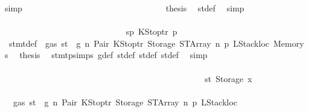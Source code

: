\begin{isabellebody}
\ simp\isanewline
\ \ \ \ \ \ \ \ \ \ \ \ \ \ \ \ \ \ \ \ \ \ \ \ \ \ \ \ \ \ \isamarkupfalse%
\ \isamarkupfalse%
\ {\isacharquery}{\kern0pt}thesis\ \isamarkupfalse%
\ st{\isacharprime}{\kern0pt}{\isacharunderscore}{\kern0pt}def\ \isamarkupfalse%
\ simp\isanewline
\ \ \ \ \ \ \ \ \ \ \ \ \ \ \ \ \ \ \ \ \ \ \ \ \ \ \ \ \isamarkupfalse%
\isanewline
\ \ \ \ \ \ \ \ \ \ \ \ \ \ \ \ \ \ \ \ \ \ \ \ \ \ \isamarkupfalse%
\isanewline
\ \ \ \ \ \ \ \ \ \ \ \ \ \ \ \ \ \ \ \ \ \ \ \ \ \ \ \ \isamarkupfalse%
\ sp{}{\isacharcolon}{\kern0pt}\ {\isacharparenleft}{\kern0pt}KStoptr\ p{\isacharprime}{\kern0pt}{\isacharparenright}{\kern0pt}\isanewline
\ \ \ \ \ \ \ \ \ \ \ \ \ \ \ \ \ \ \ \ \ \ \ \ \ \ \ \ \isamarkupfalse%
\ {}{\isacharparenleft}{\kern0pt}{}{\isacharparenright}{\kern0pt}\ stmt{\isacharunderscore}{\kern0pt}def\ {\isacharbackquoteopen}{\isasymnot}\ gas\ st\ {\isasymle}\ g{\isacharbackquoteclose}\ n\ Pair\ KStoptr\ Storage\ STArray\ n{}\ p{}\ LStackloc\ Memory\ s{}\ \isamarkupfalse%
\ {\isacharquery}{\kern0pt}thesis\ \isamarkupfalse%
\ stmt{\isachardot}{\kern0pt}psimps{\isacharparenleft}{\kern0pt}{}{\isacharparenright}{\kern0pt}\ g{\isacharunderscore}{\kern0pt}def\ st{\isacharprime}{\kern0pt}{\isacharunderscore}{\kern0pt}def\ st{\isacharprime}{\kern0pt}{\isacharprime}{\kern0pt}{\isacharunderscore}{\kern0pt}def\ st{\isacharprime}{\kern0pt}{\isacharprime}{\kern0pt}{\isacharprime}{\kern0pt}{\isacharunderscore}{\kern0pt}def\ \isamarkupfalse%
\ simp\isanewline
\ \ \ \ \ \ \ \ \ \ \ \ \ \ \ \ \ \ \ \ \ \ \ \ \ \ \isamarkupfalse%
\isanewline
\ \ \ \ \ \ \ \ \ \ \ \ \ \ \ \ \ \ \ \ \ \ \ \ \isamarkupfalse%
\isanewline
\ \ \ \ \ \ \ \ \ \ \ \ \ \ \ \ \ \ \ \ \ \ \isamarkupfalse%
\isanewline
\ \ \ \ \ \ \ \ \ \ \ \ \ \ \ \ \ \ \ \ \ \ \ \ \isamarkupfalse%
\ st{}{\isacharcolon}{\kern0pt}\ {\isacharparenleft}{\kern0pt}Storage\ x{}{\isacharparenright}{\kern0pt}\isanewline
\ \ \ \ \ \ \ \ \ \ \ \ \ \ \ \ \ \ \ \ \ \ \ \ \isamarkupfalse%
\ {}{\isacharparenleft}{\kern0pt}{}{\isacharparenright}{\kern0pt}\ {\isacharbackquoteopen}{\isasymnot}\ gas\ st\ {\isasymle}\ g{\isacharbackquoteclose}\ n\ Pair\ KStoptr\ Storage\ STArray\ n{}\ p{}\ LStackloc\isanewline

\end{isabellebody}
